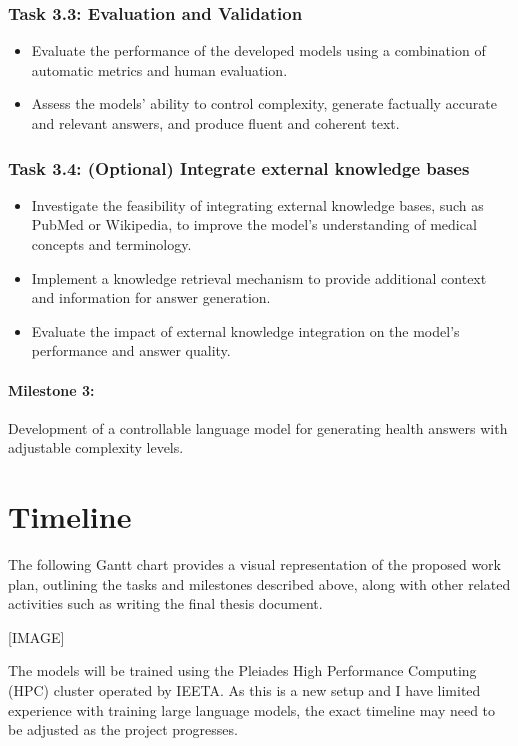 \subsubsection*{Task 3.3: Evaluation and Validation}

\begin{itemize}
    \item Evaluate the performance of the developed models using a combination of automatic metrics and human evaluation.
    \item Assess the models' ability to control complexity, generate factually accurate and relevant answers, and produce fluent and coherent text.
\end{itemize}

\subsubsection*{Task 3.4: (Optional) Integrate external knowledge bases}

\begin{itemize}
    \item Investigate the feasibility of integrating external knowledge bases, such as PubMed or Wikipedia, to improve the model's understanding of medical concepts and terminology.
    \item Implement a knowledge retrieval mechanism to provide additional context and information for answer generation.
    \item Evaluate the impact of external knowledge integration on the model's performance and answer quality.
\end{itemize}

\paragraph{Milestone 3:} Development of a controllable language model for generating health answers with adjustable complexity levels.

\section{Timeline}

The following Gantt chart provides a visual representation of the proposed work plan, outlining the tasks and milestones described above, along with other related activities such as writing the final thesis document.

[IMAGE]

The models will be trained using the Pleiades High Performance Computing (HPC) cluster operated by IEETA. As this is a new setup and I have limited experience with training large language models, the exact timeline may need to be adjusted as the project progresses.